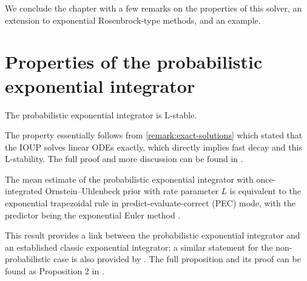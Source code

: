 \documentclass{mimosis}
\begin{document}
We conclude the chapter with a few remarks on the properties of this solver,
an extension to exponential Rosenbrock-type methods, and an example.
\section{Properties of the probabilistic exponential integrator}
\label{sec:orgf9573f3}
\begin{proposition}[L-stability]
The probabilistic exponential integrator is L-stable.
\label{prop:l-stability}
\end{proposition}
The property essentially follows from \cref{remark:exact-solutions} which stated that the IOUP solves linear ODEs exactly, which directly implies fast decay and this L-stability.
The full proof and more discussion can be found in
\probexpint{}.

\begin{proposition}
The mean estimate of the probabilistic exponential integrator with once-integrated Ornstein--Uhlenbeck prior with rate parameter \(L\) is equivalent to the exponential trapezoidal rule in predict-evaluate-correct (PEC) mode, with the predictor being the exponential Euler method
\parencite{hairer2008solving,hochbruck2009exponential}.
\label{prop:exp-trapezoidal}
\end{proposition}
This result provides a link between the probabilistic exponential integrator and an established classic exponential integrator;
a similar statement for the non-probabilistic case is also provided by \textcite[Proposition 1]{schober16_probab_model_numer_solut_initial_value_probl}.
The full proposition and its proof can be found as
Proposition 2 in
\probexpint{}.
\end{document}
